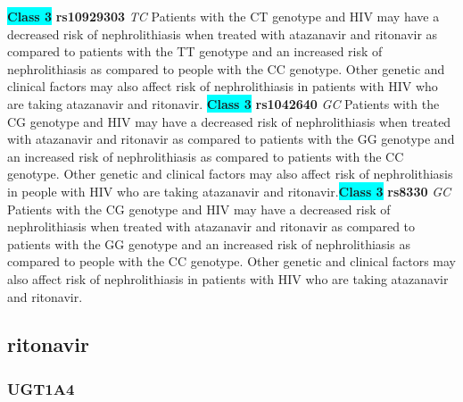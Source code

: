 \documentclass{book}
\begin{document}
\begin{center}
\textbf{\colorbox{cyan} {Class 3}} \textbf{ rs10929303 } \textit{ TC }
Patients with the CT genotype and HIV may have a decreased risk of nephrolithiasis when treated with atazanavir and ritonavir as compared to patients with the TT genotype and an increased risk of nephrolithiasis as compared to people with the CC genotype. Other genetic and clinical factors may also affect risk of nephrolithiasis in patients with HIV who are taking atazanavir and ritonavir. \textbf{\colorbox{cyan} {Class 3}} \textbf{ rs1042640 } \textit{ GC }
Patients with the CG genotype and HIV may have a decreased risk of nephrolithiasis when treated with atazanavir and ritonavir as compared to patients with the GG genotype and an increased risk of nephrolithiasis as compared to patients with the CC genotype. Other genetic and clinical factors may also affect risk of nephrolithiasis in people with HIV who are taking atazanavir and ritonavir.\textbf{\colorbox{cyan} {Class 3}} \textbf{ rs8330 } \textit{ GC }
Patients with the CG genotype and HIV may have a decreased risk of nephrolithiasis when treated with atazanavir and ritonavir as compared to patients with the GG genotype and an increased risk of nephrolithiasis as compared to people with the CC genotype. Other genetic and clinical factors may also affect risk of nephrolithiasis in patients with HIV who are taking atazanavir and ritonavir.


\end{center}\subsection{ ritonavir }


\subsubsection{ UGT1A4 }
\end{document}
